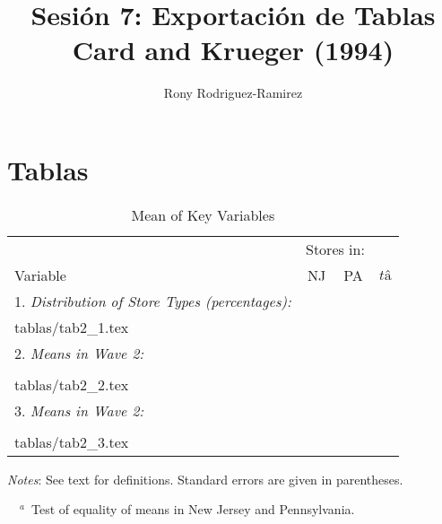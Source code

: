 \documentclass{article}
\makeatletter
\newcommand\primitiveinput[1]
{\@@input #1 }
\makeatother
\begin{document}
\title{Sesión 7: Exportación de Tablas \\ Card and Krueger (1994)}
\author{Rony Rodriguez-Ramirez}
\maketitle
\newpage
\section{Tablas}
\setcounter{table}{1}

\begin{table}[H]
	\centering
	\label{tab:Table}
		\begin{threeparttable}
			\caption{Mean of Key Variables}
			\begin{tabular}{@{}l*{3}{c}@{}}
                \toprule
							& \multicolumn{2}{c}{Stores in:} & 						\\ \cmidrule(lr){2-3}
				Variable 	& NJ & PA & $tâ$										\\
				\midrule
				1. \textit{Distribution of Store Types (percentages):} 	& & & 	\\
				\primitiveinput{tablas/tab2_1.tex}
																		& & & 	\\
				2. \textit{Means in Wave 2:}							& & & 	\\
																		& & & 	\\
				\primitiveinput{tablas/tab2_2.tex}
																		& & &	\\
				3. \textit{Means in Wave 2:}							& & & 	\\
																		& & & 	\\
				\primitiveinput{tablas/tab2_3.tex}
				\bottomrule
			\end{tabular}
			\begin{tablenotes}
				\setlength{}
				\footnotesize
				\item \textit{Notes}: See text for definitions. Standard errors are given in parentheses.
				\item ~~$^a$~Test of equality of means in New Jersey and Pennsylvania.
			\end{tablenotes}
		\end{threeparttable}
\end{table}
\setcounter{table}{3}
\end{document}
